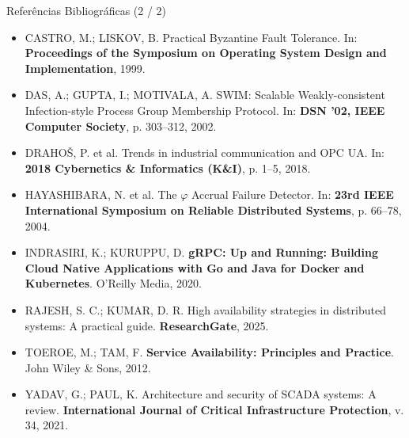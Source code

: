 \documentclass[aspectratio=169,10pt]{beamer}
\begin{document}
\begin{frame}{Referências Bibliográficas (2 / 2)}
  \scriptsize
  \begin{itemize}
    \item CASTRO, M.; LISKOV, B. Practical Byzantine Fault Tolerance. In: \textbf{Proceedings of the Symposium on Operating System Design and Implementation}, 1999.
    \item DAS, A.; GUPTA, I.; MOTIVALA, A. SWIM: Scalable Weakly-consistent Infection-style Process Group Membership Protocol. In: \textbf{DSN '02, IEEE Computer Society}, p. 303--312, 2002.
    \item DRAHOŠ, P. et al. Trends in industrial communication and OPC UA. In: \textbf{2018 Cybernetics \& Informatics (K\&I)}, p. 1--5, 2018.
    \item HAYASHIBARA, N. et al. The $\varphi$ Accrual Failure Detector. In: \textbf{23rd IEEE International Symposium on Reliable Distributed Systems}, p. 66--78, 2004.
    \item INDRASIRI, K.; KURUPPU, D. \textbf{gRPC: Up and Running: Building Cloud Native Applications with Go and Java for Docker and Kubernetes}. O'Reilly Media, 2020.
    \item RAJESH, S. C.; KUMAR, D. R. High availability strategies in distributed systems: A practical guide. \textbf{ResearchGate}, 2025.
    \item TOEROE, M.; TAM, F. \textbf{Service Availability: Principles and Practice}. John Wiley \& Sons, 2012.
    \item YADAV, G.; PAUL, K. Architecture and security of SCADA systems: A review. \textbf{International Journal of Critical Infrastructure Protection}, v. 34, 2021.
  \end{itemize}
\end{frame}
\end{document}
